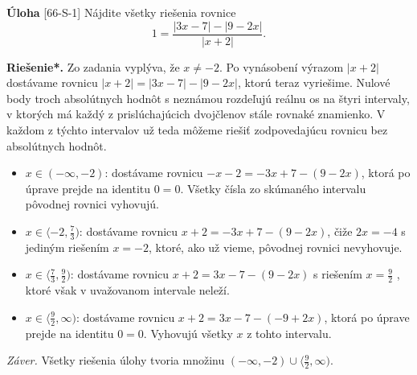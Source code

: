 \documentclass{article}
\newcommand{\rieh}{\textbf{Riešenie*.} }
\newcommand{\problem}[4]{
  \begin{tcolorbox}[breakable,notitle,boxrule=0pt,colback=light-gray,colframe=light-gray]
    \textbf{Úloha}
    [#1] #3
  \end{tcolorbox}
  \noindent#4
}
\begin{document}
\problem{66-S-1}{}{
Nájdite všetky riešenia rovnice
$$1 =\frac{|3x - 7| - |9 - 2x|}{|x + 2|}.$$
}{
\rieh Zo zadania vyplýva, že $x\neq -2$. Po vynásobení výrazom $|x + 2|$ dostávame
rovnicu $|x + 2| = |3x - 7| - |9 - 2x|$, ktorú teraz vyriešime. Nulové body troch absolútnych hodnôt s neznámou rozdeľujú reálnu os na štyri intervaly, v ktorých má každý z prislúchajúcich dvojčlenov stále rovnaké znamienko. V každom z týchto intervalov už teda môžeme riešiť zodpovedajúcu rovnicu bez absolútnych hodnôt.
\begin{itemize}
    \item $x \in (-\infty, -2)$: dostávame rovnicu $-x - 2 = -3x + 7 - (9 - 2x)$, ktorá po úprave prejde na identitu $0 = 0$. Všetky čísla zo skúmaného intervalu pôvodnej rovnici vyhovujú.
    \item $x \in \langle -2, \frac{7}{3})$: dostávame rovnicu $x+2 = -3x+7-(9-2x)$, čiže $2x = -4$ s jediným riešením $x = -2$, ktoré, ako už vieme, pôvodnej rovnici nevyhovuje.
    \item $x \in \langle \frac{7}{3}, \frac{9}{2})$: dostávame rovnicu $x + 2 = 3x - 7 - (9 - 2x)$ s riešením $x = \frac{9}{2}$ , ktoré však v uvažovanom intervale neleží.
    \item $x \in \langle \frac{9}{2}, \infty)$: dostávame rovnicu $x + 2 = 3x - 7 - (-9 + 2x)$, ktorá po úprave prejde na identitu $0 = 0$. Vyhovujú všetky $x$ z tohto intervalu.
\end{itemize}

\textit{Záver.} Všetky riešenia úlohy tvoria množinu $(-\infty, -2) \cup \langle \frac{9}{2},\infty)$.
}
\end{document}
